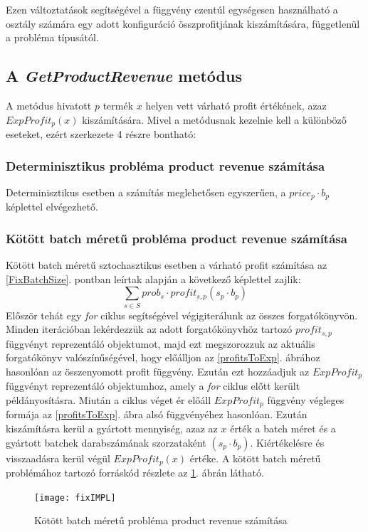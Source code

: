 Ezen változtatások segítségével a  függvény ezentúl egységesen használható a  osztály számára egy adott konfiguráció összprofitjának kiszámítására, függetlenül a probléma típusától. 
\subsection{A \textit{GetProductRevenue} metódus} \label{getProductRevenue}
A  metódus hivatott $p$ termék $x$ helyen vett várható profit értékének, azaz $ExpProfit_p(x)$ kiszámítására.
Mivel a metódusnak kezelnie kell a különböző eseteket, ezért szerkezete 4 részre bontható:
\subsubsection{Determinisztikus probléma product revenue számítása}
Determinisztikus esetben a számítás meglehetősen egyszerűen, a $price_p \cdot b_p$ képlettel elvégezhető.
\subsubsection{Kötött batch méretű probléma product revenue számítása}
Kötött batch méretű sztochasztikus esetben a várható profit számítása az \ref{FixBatchSize}. pontban leírtak alapján a következő képlettel zajlik: $$\sum_{s \in S} prob_s \cdot profit_{s,p} (s_p \cdot b_p)$$
Először tehát egy \textit{for} ciklus segítségével végigiterálunk az összes forgatókönyvön.
Minden iterációban lekérdezzük az adott forgatókönyvhöz tartozó $profit_{s,p}$ függvényt reprezentáló  objektumot, majd ezt megszorozzuk az aktuális forgatókönyv valószínűségével, hogy előálljon az \ref{profitsToExp}. ábrához hasonlóan az összenyomott profit függvény.
Ezután ezt hozzáadjuk az $ExpProfit_p$ függvényt reprezentáló  objektumhoz, amely a \textit{for} ciklus előtt került példányosításra.
Miután a ciklus véget ér előáll  $ExpProfit_p$ függvény végleges formája az \ref{profitsToExp}. ábra alsó függvényéhez hasonlóan.
Ezután kiszámításra kerül a gyártott mennyiség, azaz az $x$ érték a batch méret és a gyártott batchek darabszámának szorzataként $(s_p \cdot b_p)$.
Kiértékelésre és visszaadásra kerül végül $ExpProfit_p(x)$ értéke.
A kötött batch méretű problémához tartozó forráskód részlete az \ref{fixIMPL}. ábrán látható.
\begin{figure}[H]
\begin{center}
\texttt{[image: fixIMPL]}
\caption{Kötött batch méretű probléma product revenue számítása}
\label{fixIMPL}
\end{center}
\end{figure} 
